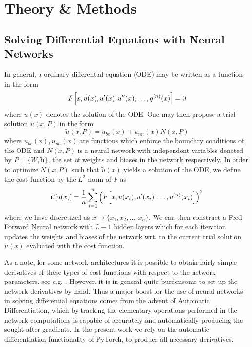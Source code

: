 \documentclass[reprint, english, nofootinbib]{revtex4-2}
\begin{document}
\section{Theory \& Methods}

\subsection{Solving Differential Equations with Neural Networks}
\noindent
In general, a ordinary differential equation (ODE) may be written as a function in the form
\begin{equation}
    F \qty[x, u(x), u'(x), u''(x), \dots, g^{(n)}(x)] = 0
\end{equation}    
where $u(x)$ denotes the solution of the ODE. One may then propose a trial solution $\tilde u(x,P)$ in the form
\begin{equation}
    \tilde u(x, P) = u_{bc}(x) + u_{nn}(x)N(x, P) 
\end{equation}
where $u_{bc}(x), u_{nn}(x)$ are functions which enforce the boundary conditions of the ODE and $N(x, P)$ is a neural network with independent variables denoted by $P = \{W, \pmb b\}$, the set of weights and biases in the network respectively. In order to optimize $N(x, P)$ such that $\tilde u(x)$ yields a solution of the ODE, we define the cost function by the $L^2$ norm of $F$ as
\begin{equation}
    \mathcal C\qty[u\qty(x)] = \frac{1}{n} \sum_{i=1}^{n}\qty(F\qty[x, u(x_i), u'(x_i), \dots, u^{(n)}(x_i)])^2
\end{equation}
where we have discretized as $x \rightarrow \{x_1, x_2 ,\dots, x_{n}\}$. We can then construct a Feed-Forward Neural network with $L-1$ hidden layers which for each iteration updates the weights and biases of the network wrt. to the current trial solution $\tilde u(x)$ evaluated with the cost function. 


As a note, for some network architectures it is possible to obtain fairly simple derivatives of these types of cost-functions with respect to the network parameters, see e.g. \cite{Lagaris_1998}. However, it is in general quite burdensome to set up the network-derivatives by hand. Thus a major boost for the use of neural networks in solving differential equations comes from the advent of Automatic Differentiation, which by tracking the elementary operations performed in the network computations is capable of accurately and automatically producing the sought-after gradients. In the present work we rely on the automatic differentiation functionality of PyTorch, to produce all necessary derivatives.
\end{document}
